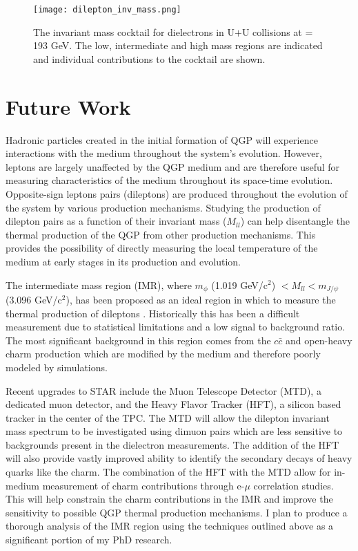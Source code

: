 \begin{figure}[H]
		\centering 
		\texttt{[image: dilepton\_inv\_mass.png]}
		\caption{ \label{fig:dilepton} The invariant mass cocktail for dielectrons in U$+$U collisions at \snn = 193 GeV. The low, intermediate and high mass regions are indicated and individual contributions to the cocktail are shown. }
	\end{figure}

\section{Future Work}
	\label{sec:future}
	Hadronic particles created in the initial formation of QGP will experience interactions with the medium throughout the system's evolution. However, leptons are largely unaffected by the QGP medium and are therefore useful for measuring characteristics of the medium throughout its space-time evolution. Opposite-sign leptons pairs (dileptons) are produced throughout the evolution of the system by various production mechanisms. Studying the production of dilepton pairs as a function of their invariant mass ($M_{ll}$) can help disentangle the thermal production of the QGP from other production mechanisms. This provides the possibility of directly measuring the local temperature of the medium at early stages in its production and evolution.

	The intermediate mass region (IMR), where $m_{\phi}$ (1.019 GeV/c$^2$) $< M_{ll} < m_{J/\psi}$ (3.096 GeV/c$^2$), has been proposed as an ideal region in which to measure the thermal production of dileptons \cite{gale_intermediate_2007}. Historically this has been a difficult measurement due to statistical limitations and a low signal to background ratio. The most significant background in this region comes from the $c\bar{c}$ and open-heavy charm production which are modified by the medium and therefore poorly modeled by simulations. 

	Recent upgrades to STAR include the Muon Telescope Detector (MTD), a dedicated muon detector, and the Heavy Flavor Tracker (HFT), a silicon based tracker in the center of the TPC\cite{yang_calibration_2014}\cite{schambach_star_2014}. The MTD will allow the dilepton invariant mass spectrum to be investigated using dimuon pairs which are less sensitive to backgrounds present in the dielectron measurements. The addition of the HFT will also provide vastly improved ability to identify the secondary decays of heavy quarks like the charm. The combination of the HFT with the MTD allow for in-medium measurement of charm contributions through e-$\mu$ correlation studies. This will help constrain the charm contributions in the IMR and improve the sensitivity to possible QGP thermal production mechanisms. I plan to produce a thorough analysis of the IMR region using the techniques outlined above as a significant portion of my PhD research.

	